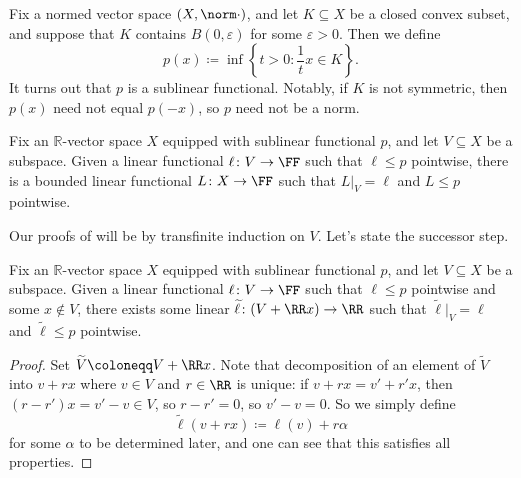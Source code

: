 \documentclass[../notes.tex]{subfiles}
\begin{document}
\begin{example}
	Fix a normed vector space $(X,\norm\cdot)$, and let $K\subseteq X$ be a closed convex subset, and suppose that $K$ contains $B(0,\varepsilon)$ for some $\varepsilon>0$. Then we define
	\[p(x)\coloneqq\inf\left\{t>0:\frac1tx\in K\right\}.\]
	It turns out that $p$ is a sublinear functional. Notably, if $K$ is not symmetric, then $p(x)$ need not equal $p(-x)$, so $p$ need not be a norm.
\end{example}
\begin{theorem} \label{thm:hb-sub}
	Fix an $\mathbb R$-vector space $X$ equipped with sublinear functional $p$, and let $V\subseteq X$ be a subspace. Given a linear functional $\ell\colon V\to\FF$ such that $\ell\le p$ pointwise, there is a bounded linear functional $L\colon X\to\FF$ such that $L|_V=\ell$ and $L\le p$ pointwise.
\end{theorem}
Our proofs of  will be by transfinite induction on $V$. Let's state the successor step.
\begin{lemma}
	Fix an $\mathbb R$-vector space $X$ equipped with sublinear functional $p$, and let $V\subseteq X$ be a subspace. Given a linear functional $\ell\colon V\to\FF$ such that $\ell\le p$ pointwise and some $x\notin V$, there exists some linear $\widetilde\ell\colon(V+\RR x)\to\RR$ such that $\widetilde\ell|_V=\ell$ and $\widetilde\ell\le p$ pointwise.
\end{lemma}
\begin{proof}
	Set $\widetilde V\coloneqq V+\RR x$. Note that decomposition of an element of $\widetilde V$ into $v+rx$ where $v\in V$ and $r\in\RR$ is unique: if $v+rx=v'+r'x$, then $(r-r')x=v'-v\in V$, so $r-r'=0$, so $v'-v=0$. So we simply define
	\[\widetilde\ell(v+rx)\coloneqq\ell(v)+r\alpha\]
	for some $\alpha$ to be determined later, and one can see that this satisfies all properties.
\end{proof}
\end{document}

